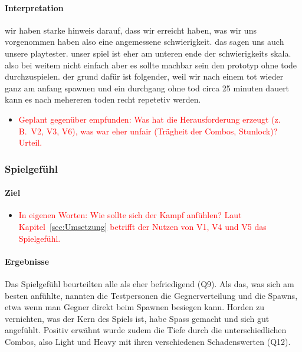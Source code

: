 \documentclass[../Main.tex]{subfiles}
\begin{document}
\paragraph{Interpretation}

wir haben starke hinweis darauf, dass wir erreicht haben, was wir uns vorgenommen haben also eine angemessene schwierigkeit. das sagen uns auch unsere playtester. unser spiel ist eher am unteren ende der schwierigkeits skala. also bei weitem nicht einfach aber es sollte machbar sein den prototyp ohne tode durchzuspielen. der grund dafür ist folgender, weil wir nach einem tot wieder ganz am anfang spawnen und ein durchgang ohne tod circa 25 minuten dauert kann es nach mehereren toden recht repetetiv werden.

\begin{itemize}[leftmargin=1.5cm]
    \item \textcolor{red}{Geplant gegenüber empfunden: Was hat die Herausforderung erzeugt (z.\,B.\ V2, V3, V6), was war eher unfair (Trägheit der Combos, Stunlock)? Urteil.}
\end{itemize}

\subsubsection{Spielgefühl}

\paragraph{Ziel}

\begin{itemize}[leftmargin=1.5cm]
    \item \textcolor{red}{In eigenen Worten: Wie sollte sich der Kampf anfühlen? Laut Kapitel~\ref{sec:Umsetzung} betrifft der Nutzen von V1, V4 und V5 das Spielgefühl.}
\end{itemize}

\paragraph{Ergebnisse}
Das Spielgefühl beurteilten alle als eher befriedigend (Q9). Als das, was sich am besten anfühlte, nannten die Testpersonen die Gegnerverteilung und die Spawns, etwa wenn man Gegner direkt beim Spawnen besiegen kann. Horden zu vernichten, was der Kern des Spiels ist, habe Spass gemacht und sich gut angefühlt. Positiv erwähnt wurde zudem die Tiefe durch die unterschiedlichen Combos, also Light und Heavy mit ihren verschiedenen Schadenswerten (Q12).
\end{document}
